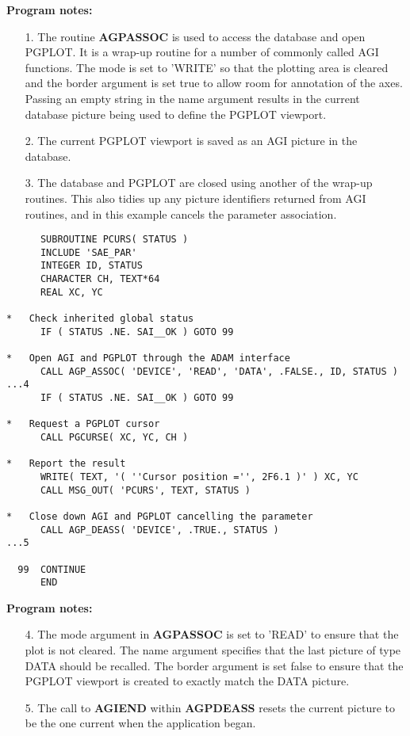 \documentclass[twoside,11pt]{article}
\newcommand{\htmlref}[2]{#1}
\renewcommand{\_}{\texttt{\symbol{95}}}
\begin{document}
{\bf Program notes:}
\begin{enumerate}
\item[1.] The routine \htmlref{{\bf AGP\_ASSOC}}{AGP_ASSOC}
 is used to access the database and
open PGPLOT. It is a wrap-up routine for a number of commonly called AGI
functions. The mode is set to 'WRITE' so that the plotting area is cleared
and the border argument is set true to allow room for annotation of the
axes. Passing an empty string in the name argument results in the current
database picture being used to define the PGPLOT viewport.
\item[2.] The current PGPLOT viewport is saved as an AGI picture in the
database.
\item[3.] The database and PGPLOT are closed using another of the wrap-up
routines. This also tidies up any picture identifiers returned from AGI
routines, and in this example cancels the parameter association.
\end{enumerate}

\begin{verbatim}
      SUBROUTINE PCURS( STATUS )
      INCLUDE 'SAE_PAR'
      INTEGER ID, STATUS
      CHARACTER CH, TEXT*64
      REAL XC, YC

*   Check inherited global status
      IF ( STATUS .NE. SAI__OK ) GOTO 99

*   Open AGI and PGPLOT through the ADAM interface
      CALL AGP_ASSOC( 'DEVICE', 'READ', 'DATA', .FALSE., ID, STATUS )   ...4
      IF ( STATUS .NE. SAI__OK ) GOTO 99

*   Request a PGPLOT cursor
      CALL PGCURSE( XC, YC, CH )

*   Report the result
      WRITE( TEXT, '( ''Cursor position ='', 2F6.1 )' ) XC, YC
      CALL MSG_OUT( 'PCURS', TEXT, STATUS )

*   Close down AGI and PGPLOT cancelling the parameter
      CALL AGP_DEASS( 'DEVICE', .TRUE., STATUS )                        ...5

  99  CONTINUE
      END
\end{verbatim}

{\bf Program notes:}
\begin{enumerate}
\item[4.] The mode argument in {\bf AGP\_ASSOC} is set to 'READ' to ensure
that the plot is not cleared. The name argument specifies that the last
picture of type DATA should be recalled.
The border argument is set false to ensure that the PGPLOT viewport is
created to exactly match the DATA picture.
\item[5.] The call to \htmlref{{\bf AGI\_END}}{AGI_END}
within \htmlref{{\bf AGP\_DEASS}}{AGP_DEASS} resets the
current picture to be the one current when the application began.
\end{enumerate}
\end{document}
